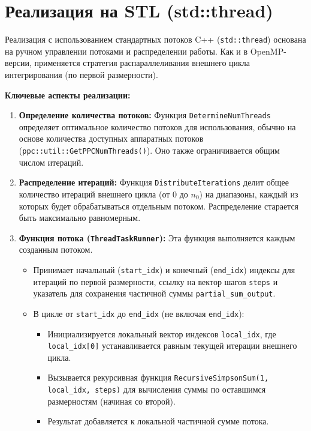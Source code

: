 \documentclass[a4paper,12pt]{article}
\begin{document}
\newpage
\section{Реализация на STL (std::thread)}
\label{sec:stl_implementation}

Реализация с использованием стандартных потоков C++ (\texttt{std::thread}) основана на ручном управлении потоками и распределении работы. Как и в OpenMP-версии, применяется стратегия распараллеливания внешнего цикла интегрирования (по первой размерности).

\textbf{Ключевые аспекты реализации:}
\begin{enumerate}
    \item \textbf{Определение количества потоков:} Функция \texttt{DetermineNumThreads} определяет оптимальное количество потоков для использования, обычно на основе количества доступных аппаратных потоков (\texttt{ppc::util::GetPPCNumThreads()}). Оно также ограничивается общим числом итераций.
    \item \textbf{Распределение итераций:} Функция \texttt{DistributeIterations} делит общее количество итераций внешнего цикла (от $0$ до $n_0$) на диапазоны, каждый из которых будет обрабатываться отдельным потоком. Распределение старается быть максимально равномерным.
    \item \textbf{Функция потока (\texttt{ThreadTaskRunner}):} Эта функция выполняется каждым созданным потоком.
        \begin{itemize}
            \item Принимает начальный (\texttt{start\_idx}) и конечный (\texttt{end\_idx}) индексы для итераций по первой размерности, ссылку на вектор шагов \texttt{steps} и указатель для сохранения частичной суммы \texttt{partial\_sum\_output}.
            \item В цикле от \texttt{start\_idx} до \texttt{end\_idx} (не включая \texttt{end\_idx}):
                \begin{itemize}
                    \item Инициализируется локальный вектор индексов \texttt{local\_idx}, где \texttt{local\_idx[0]} устанавливается равным текущей итерации внешнего цикла.
                    \item Вызывается рекурсивная функция \texttt{RecursiveSimpsonSum(1, local\_idx, steps)} для вычисления суммы по оставшимся размерностям (начиная со второй).
                    \item Результат добавляется к локальной частичной сумме потока.
                \end{itemize}

\end{itemize}
\end{enumerate}
\end{document}
